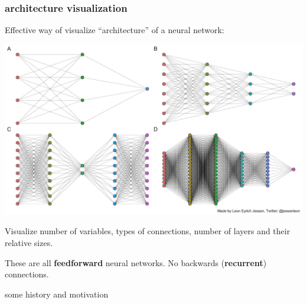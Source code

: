 \documentclass[handout,compress]{beamer}
\begin{document}
\begin{frame}
	\frametitle{architecture visualization}
	\small
 	Effective way of visualize ``architecture'' of a neural network:
	\begin{center} 
		\includegraphics[width=.8\textwidth]{arch_diffs.png}
	\end{center}
Visualize number of variables, types of connections, number of layers and their relative sizes.

These are all \textbf{feedforward} neural networks. No backwards (\textbf{recurrent}) connections.
\end{frame}

\begin{frame}[standout]
	some history and motivation
\end{frame}
\end{document}

